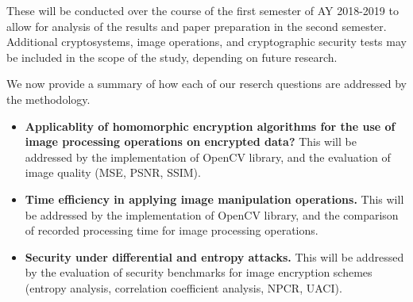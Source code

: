 These will be conducted over the course of the first semester of AY 2018-2019 to allow for analysis of the results and paper preparation in the second semester. Additional cryptosystems, image operations, and cryptographic security tests may be included in the scope of the study, depending on future research.

We now provide a summary of how each of our reserch questions are addressed by the methodology.
\begin{itemize}
	\item \textbf{Applicablity of homomorphic encryption algorithms for the use of image processing operations on encrypted data?} This will be addressed by the implementation of OpenCV library, and the evaluation of image quality (MSE, PSNR, SSIM).
	\item \textbf{Time efficiency in applying image manipulation operations.} This will be addressed by the implementation of OpenCV library, and the comparison of recorded processing time for image processing operations.
	\item \textbf{Security under differential and entropy attacks.}
	This will be addressed by the evaluation of security benchmarks for image encryption schemes (entropy analysis, correlation coefficient analysis, NPCR, UACI).
\end{itemize}

